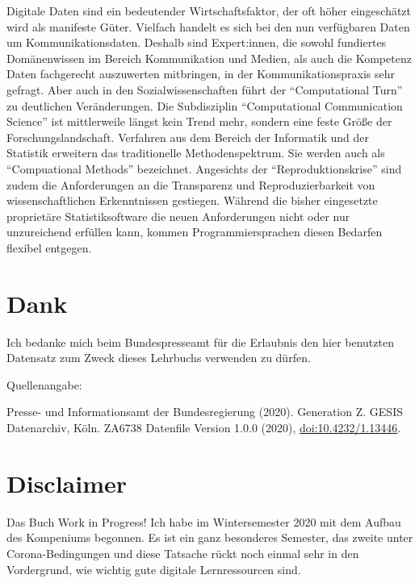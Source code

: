 \documentclass[
]{book}
\begin{document}
Digitale Daten sind ein bedeutender Wirtschaftsfaktor, der oft höher eingeschätzt wird als manifeste Güter. Vielfach handelt es sich bei den nun verfügbaren Daten um Kommunikationsdaten. Deshalb sind Expert:innen, die sowohl fundiertes Domänenwissen im Bereich Kommunikation und Medien, als auch die Kompetenz Daten fachgerecht auszuwerten mitbringen, in der Kommunikationspraxis sehr gefragt. Aber auch in den Sozialwissenschaften führt der ``Computational Turn'' zu deutlichen Veränderungen. Die Subdisziplin ``Computational Communication Science'' ist mittlerweile längst kein Trend mehr, sondern eine feste Größe der Forschungslandschaft. Verfahren aus dem Bereich der Informatik und der Statistik erweitern das traditionelle Methodenspektrum. Sie werden auch als ``Compuational Methods'' bezeichnet. Angesichts der ``Reproduktionskrise'' sind zudem die Anforderungen an die Transparenz und Reproduzierbarkeit von wissenschaftlichen Erkenntnissen gestiegen. Während die bisher eingesetzte proprietäre Statistiksoftware die neuen Anforderungen nicht oder nur unzureichend erfüllen kann, kommen Programmiersprachen diesen Bedarfen flexibel entgegen.

\hypertarget{dank}{%
\section*{Dank}\label{dank}}

Ich bedanke mich beim Bundespresseamt für die Erlaubnis den hier benutzten Datensatz zum Zweck dieses Lehrbuchs verwenden zu dürfen.

Quellenangabe:

Presse- und Informationsamt der Bundesregierung (2020). Generation Z. GESIS Datenarchiv, Köln. ZA6738 Datenfile Version 1.0.0 (2020), \href{https://dbk.gesis.org/dbksearch/sdesc2.asp?no=6738\&db=e\&doi=10.4232/1.13446}{doi:10.4232/1.13446}.

\hypertarget{disclaimer}{%
\section*{Disclaimer}\label{disclaimer}}

Das Buch Work in Progress! Ich habe im Wintersemester 2020 mit dem Aufbau des Kompeniums begonnen. Es ist ein ganz besonderes Semester, das zweite unter Corona-Bedingungen und diese Tatsache rückt noch einmal sehr in den Vordergrund, wie wichtig gute digitale Lernressourcen sind.
\end{document}
